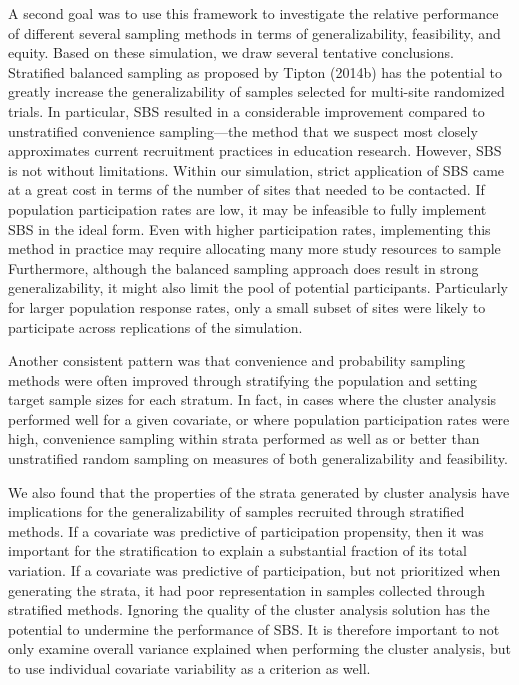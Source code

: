 \documentclass[
  man,floatsintext]{apa6}
\begin{document}
A second goal was to use this framework to investigate the relative performance of different several sampling methods in terms of generalizability, feasibility, and equity. Based on these simulation, we draw several tentative conclusions. Stratified balanced sampling as proposed by Tipton (2014b) has the potential to greatly increase the generalizability of samples selected for multi-site randomized trials. In particular, SBS resulted in a considerable improvement compared to unstratified convenience sampling---the method that we suspect most closely approximates current recruitment practices in education research. However, SBS is not without limitations. Within our simulation, strict application of SBS came at a great cost in terms of the number of sites that needed to be contacted. If population participation rates are low, it may be infeasible to fully implement SBS in the ideal form. Even with higher participation rates, implementing this method in practice may require allocating many more study resources to sample Furthermore, although the balanced sampling approach does result in strong generalizability, it might also limit the pool of potential participants. Particularly for larger population response rates, only a small subset of sites were likely to participate across replications of the simulation.

Another consistent pattern was that convenience and probability sampling methods were often improved through stratifying the population and setting target sample sizes for each stratum. In fact, in cases where the cluster analysis performed well for a given covariate, or where population participation rates were high, convenience sampling within strata performed as well as or better than unstratified random sampling on measures of both generalizability and feasibility.

We also found that the properties of the strata generated by cluster analysis have implications for the generalizability of samples recruited through stratified methods. If a covariate was predictive of participation propensity, then it was important for the stratification to explain a substantial fraction of its total variation. If a covariate was predictive of participation, but not prioritized when generating the strata, it had poor representation in samples collected through stratified methods. Ignoring the quality of the cluster analysis solution has the potential to undermine the performance of SBS. It is therefore important to not only examine overall variance explained when performing the cluster analysis, but to use individual covariate variability as a criterion as well.
\end{document}
